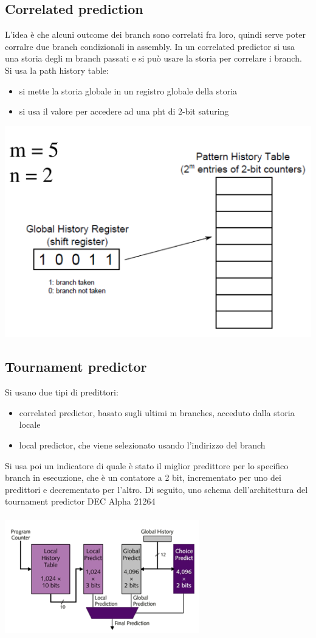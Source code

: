 \documentclass[12pt, oneside]{extbook} %
\begin{document}
\subsection{Correlated prediction}
L'idea è che alcuni outcome dei branch sono correlati fra loro, quindi serve poter corralre due branch condizionali in assembly. In un correlated predictor si usa una storia degli m branch passati e si può usare la storia per correlare i branch. Si usa la path history table:
\begin{itemize}
\item si mette la storia globale in un registro globale della storia
\item si usa il valore per accedere ad una pht di 2-bit saturing 
\end{itemize}
\includegraphics[scale=0.5]{immagini/corr_pred}
\subsection{Tournament predictor}
Si usano due tipi di predittori:
\begin{itemize}
\item correlated predictor, basato sugli ultimi m branches, acceduto dalla storia locale
\item local predictor, che viene selezionato usando l'indirizzo del branch
\end{itemize}
Si usa poi un indicatore di quale è stato il miglior predittore per lo specifico branch in esecuzione, che è un contatore a 2 bit, incrementato per uno dei predittori e decrementato per l'altro. Di seguito, uno schema dell'architettura del tournament predictor DEC Alpha 21264\\\\
\includegraphics[scale=1]{immagini/tourn_pred}
\end{document}
